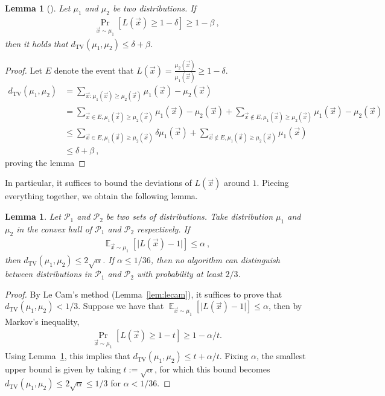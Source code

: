 \documentclass[11pt]{article}
\newtheorem{lemma}[theorem]{Lemma}
\newcommand{\E}{\mathop{\mathbb{E}}}
\newcommand{\TV}{d_{\text{TV}}}
\begin{document}
\begin{lemma}[{\cite[Lemma 6]{chen2024optimal}}]\label{lem:like_ratio_prob}
    Let $\mu_1$ and $\mu_2$ be two distributions. If 
    \begin{align}
        \Pr_{\vec{x} \sim \mu_1}[L(\vec{x}) \geq 1-\delta] \geq 1-\beta\ ,
    \end{align}
    then it holds that $\TV(\mu_1,\mu_2) \leq \delta + \beta$.
\end{lemma}
\begin{proof}
    Let $E$ denote the event that $L(\vec{x})=\frac{\mu_2(\vec{x})}{\mu_1(\vec{x})} \geq 1-\delta$.
    \begin{align}
        \TV(\mu_1,\mu_2) & = \sum_{\vec{x}: \mu_1(\vec{x}) \geq \mu_2(\vec{x})} \mu_1(\vec{x}) - \mu_2(\vec{x})\\
        & = \sum_{\vec{x}\in E, \mu_1(\vec{x}) \geq \mu_2(\vec{x})}\mu_1(\vec{x}) - \mu_2(\vec{x}) + \sum_{\vec{x}\not\in E, \mu_1(\vec{x}) \geq \mu_2(\vec{x})}\mu_1(\vec{x}) - \mu_2(\vec{x})\\
        & \leq \sum_{\vec{x}\in E, \mu_1(\vec{x}) \geq \mu_2(\vec{x})}\delta \mu_1(\vec{x}) + \sum_{\vec{x}\not\in E, \mu_1(\vec{x}) \geq \mu_2(\vec{x})}\mu_1(\vec{x})\\
        & \leq \delta + \beta\ ,
    \end{align}
    proving the lemma
\end{proof}

In particular, it suffices to bound the deviations of $L(\vec{x})$ around $1$. Piecing everything together, we obtain the following lemma.

\begin{lemma}\label{lem:le_cam_exp}
    Let $\mathcal{P}_1$ and $\mathcal{P}_2$ be two sets of distributions. Take distribution $\mu_1$  and $\mu_2$ in the convex hull of $\mathcal{P}_1$ and $\mathcal{P}_2$ respectively. If 
    \begin{align}
        \E_{\vec{x}\sim \mu_1}\left[\vert  L(\vec{x})-1\vert \right] \leq \alpha\ ,
    \end{align}
    then $\TV(\mu_1,\mu_2) \leq 2\sqrt{\alpha}$. If $\alpha \leq 1/36$, then no algorithm can distinguish between distributions in $\mathcal{P}_1$ and $\mathcal{P}_2$ with probability at least $2/3$.
\end{lemma}
\begin{proof}
    By Le Cam's method (Lemma~\ref{lem:lecam}), it suffices to prove that $\TV(\mu_1,\mu_2) < 1/3$. Suppose we have that $\E_{\vec{x}\sim \mu_1}\left[\vert  L(\vec{x})-1\vert \right] \leq \alpha$, 
    then by Markov's inequality,
    \begin{align}
        \Pr_{\vec{x}\sim \mu_1}[L(\vec{x})\geq 1-t]\geq 1-{\alpha}/{t} .
    \end{align}
    Using Lemma~\ref{lem:like_ratio_prob}, this implies that $\TV(\mu_1,\mu_2) \leq t + {\alpha}/{t}$. Fixing $\alpha$, the smallest upper bound is given by taking $t := \sqrt{\alpha}$, for which this bound becomes $\TV(\mu_1,\mu_2) \leq 2\sqrt{\alpha}\leq 1/3$ for $\alpha < 1/36$.
\end{proof}
\end{document}
